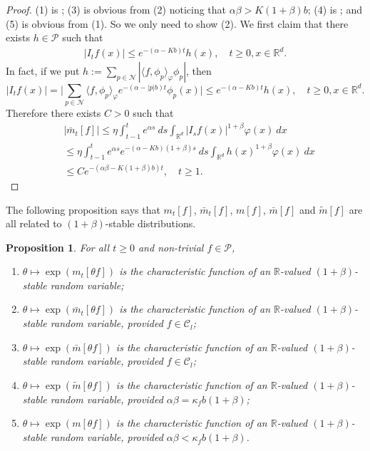 \documentclass[12pt,a4paper]{amsart}
\theoremstyle{plain}
\newtheorem{prop}[thm]{Proposition}
\theoremstyle{definition}
\numberwithin{equation}{section}
\begin{document}
\begin{proof}
  (1) is  \cite[Lemma 2.7]{MarksMilos2018CLT}; (3) is obvious from (2) noticing that $\alpha\beta>K(1+\beta)b$; (4) is \cite[Lemma 4.2]{MarksMilos2018CLT}; and (5) is obvious from (1).
  So we only need to show (2). 
  We first claim that there exists $h\in \mathcal{P}$ such that
  \begin{align}
    \label{ineq: control of Itg}
    |I_tf(x)|
    \leq e^{-(\alpha-Kb)t}h(x),
    \quad t\geq 0, x\in \mathbb{R}^d.
  \end{align}
  In fact, if we put $h:= \sum_{p\in \mathcal N} |\langle f,\phi_p\rangle_{\varphi}\phi_p|$, then
\begin{equation}
  \label{eq: supper for Itf}
  |I_tf(x)|
  =\Big|\sum_{p\in\mathcal{N}} \langle f,\phi_p\rangle_{\varphi} e^{-(\alpha-|p|b)t}\phi_p(x)\Big|
  \leq e^{-(\alpha-Kb)t}h(x),
  \quad t\geq 0,x\in \mathbb{R}^d.
\end{equation}
Therefore there exists  $C>0$ such that
\begin{align}
  & |\bar{m}_t[f]|
    \leq \eta \int_{t-1}^{t} e^{\alpha s}~ds \int_{\mathbb R^d} | I_sf(x)|^{1+\beta}\varphi(x)~dx \\
  & \leq \eta \int_{t-1}^{t} e^{\alpha s}e^{-(\alpha-Kb)(1+\beta)s}~ds\int_{\mathbb R^d} h(x)^{1+\beta}\varphi(x)~dx \\
  & \leq C e^{-(\alpha\beta-K(1+\beta)b)t}
    , \quad t\geq 1.
\end{align}
\end{proof}
The following proposition says that $m_t[f]$, $\bar m_t[f]$, $m[f]$, $\bar m[f]$ and  $\widetilde m[f]$ are all related to $(1+\beta)$-stable distributions.
\begin{prop}
  \label{prop: alpha stable rv}
	For all $t\geq 0$ and non-trivial $f\in \mathcal P$,
  \begin{enumerate}
  \item
    \label{item: stable 1}
    $\theta \mapsto \exp(m_t[\theta f])$ is the characteristic function of an $\mathbb R$-valued $(1+\beta)$-stable random variable;
  \item
    \label{item: stable 2}
    $\theta \mapsto \exp(\bar{m}_t[\theta f])$ is the characteristic function of an $\mathbb R$-valued $(1+\beta)$-stable random variable, provided $f \in \mathcal C_l$;
  \item
    \label{item: stable 3}
    $\theta \mapsto \exp(\bar m[\theta f])$ is the characteristic function of an $\mathbb R$-valued $(1+\beta)$-stable random variable, provided $f \in \mathcal C_l$;
  \item
    \label{item: stable 4}
    $\theta \mapsto \exp(\widetilde m[\theta f])$ is the characteristic function of an $\mathbb R$-valued $(1+\beta)$-stable random variable, provided $\alpha\beta=\kappa_f b(1+\beta)$;
  \item
    \label{item: stable 5}
    $\theta \mapsto \exp(m[\theta f])$ is the characteristic function of an $\mathbb R$-valued $(1+\beta)$-stable random variable, provided $\alpha\beta < \kappa_f b(1+\beta)$.
  \end{enumerate}
\end{prop}
\end{document}

